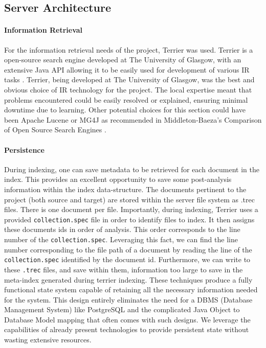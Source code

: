 \documentclass{l4proj}
\newcommand{\code}[1]{\texttt{#1}}
\begin{document}
\subsection{Server Architecture}
\paragraph{Information Retrieval}
For the information retrieval needs of the project, Terrier was used. Terrier is a open-source search engine developed at The University of Glasgow, with an extensive Java API allowing it to be easily used for development of various IR tasks \cite{terrier} \cite{macdonald2012puppy}.
Terrier, being developed at The University of Glasgow, was the best and obvious choice of IR technology for the project. The local expertise meant that problems encountered could be easily resolved or explained, ensuring minimal downtime due to learning.
Other potential choices for this section could have been Apache Lucene or MG4J as recommended in Middleton-Baeza's Comparison of Open Source Search Engines \cite{middleton2007comparison}.

\paragraph{Persistence}
During indexing, one can save metadata to be retrieved for each document in the index. This provides an excellent opportunity to save some post-analysis information within the index data-structure.
The documents pertinent to the project (both source and target) are stored within the server file system as .trec files. There is one document per file.
Importantly, during indexing, Terrier uses a provided \code{collection.spec} file in order to identify files to index. It then assigns these documents ids in order of analysis. This order corresponds to the line number of the \code{collection.spec}. Leveraging this fact, we can find the line number corresponding to the file path of a document by reading the line of the \code{collection.spec} identified by the document id.
Furthermore, we can write to these \code{.trec} files, and save within them, information too large to save in the meta-index generated during terrier indexing.
These techniques produce a fully functional state system capable of retaining all the necessary information needed for the system.
This design entirely eliminates the need for a DBMS (Database Management System) like PostgreSQL and the complicated Java Object to Database Model mapping that often comes with such designs.
We leverage the capabilities of already present technologies to provide persistent state without wasting extensive resources.
\end{document}
